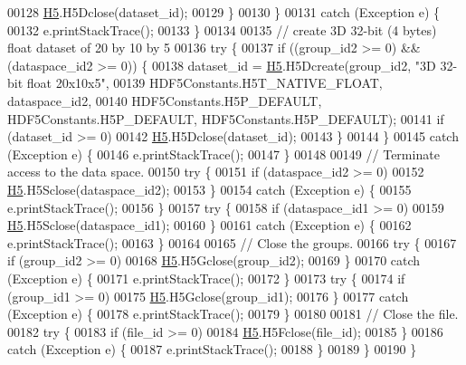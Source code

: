 \begin{DoxyCode}
00128                     \hyperlink{namespace_h5}{H5}.H5Dclose(dataset\_id);
00129             \}
00130         \}
00131         \textcolor{keywordflow}{catch} (Exception e) \{
00132             e.printStackTrace();
00133         \}
00134 
00135         \textcolor{comment}{// create 3D 32-bit (4 bytes) float dataset of 20 by 10 by 5}
00136         \textcolor{keywordflow}{try} \{
00137             \textcolor{keywordflow}{if} ((group\_id2 >= 0) && (dataspace\_id2 >= 0)) \{
00138                 dataset\_id = \hyperlink{namespace_h5}{H5}.H5Dcreate(group\_id2, \textcolor{stringliteral}{"3D 32-bit float  20x10x5"},
00139                         HDF5Constants.H5T\_NATIVE\_FLOAT, dataspace\_id2,
00140                         HDF5Constants.H5P\_DEFAULT, HDF5Constants.H5P\_DEFAULT, HDF5Constants.H5P\_DEFAULT);
00141                 \textcolor{keywordflow}{if} (dataset\_id >= 0)
00142                     \hyperlink{namespace_h5}{H5}.H5Dclose(dataset\_id);
00143             \}
00144         \}
00145         \textcolor{keywordflow}{catch} (Exception e) \{
00146             e.printStackTrace();
00147         \}
00148 
00149         \textcolor{comment}{// Terminate access to the data space.}
00150         \textcolor{keywordflow}{try} \{
00151             \textcolor{keywordflow}{if} (dataspace\_id2 >= 0)
00152                 \hyperlink{namespace_h5}{H5}.H5Sclose(dataspace\_id2);
00153         \}
00154         \textcolor{keywordflow}{catch} (Exception e) \{
00155             e.printStackTrace();
00156         \}
00157         \textcolor{keywordflow}{try} \{
00158             \textcolor{keywordflow}{if} (dataspace\_id1 >= 0)
00159                 \hyperlink{namespace_h5}{H5}.H5Sclose(dataspace\_id1);
00160         \}
00161         \textcolor{keywordflow}{catch} (Exception e) \{
00162             e.printStackTrace();
00163         \}
00164 
00165         \textcolor{comment}{// Close the groups.}
00166         \textcolor{keywordflow}{try} \{
00167             \textcolor{keywordflow}{if} (group\_id2 >= 0)
00168                 \hyperlink{namespace_h5}{H5}.H5Gclose(group\_id2);
00169         \}
00170         \textcolor{keywordflow}{catch} (Exception e) \{
00171             e.printStackTrace();
00172         \}
00173         \textcolor{keywordflow}{try} \{
00174             \textcolor{keywordflow}{if} (group\_id1 >= 0)
00175                 \hyperlink{namespace_h5}{H5}.H5Gclose(group\_id1);
00176         \}
00177         \textcolor{keywordflow}{catch} (Exception e) \{
00178             e.printStackTrace();
00179         \}
00180 
00181         \textcolor{comment}{// Close the file.}
00182         \textcolor{keywordflow}{try} \{
00183             \textcolor{keywordflow}{if} (file\_id >= 0)
00184                 \hyperlink{namespace_h5}{H5}.H5Fclose(file\_id);
00185         \}
00186         \textcolor{keywordflow}{catch} (Exception e) \{
00187             e.printStackTrace();
00188         \}
00189     \}
00190 \}
\end{DoxyCode}
